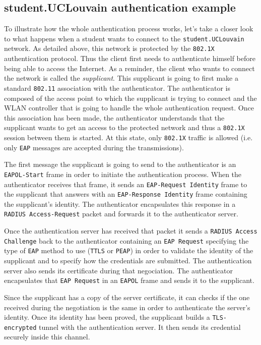\subsection{student.UCLouvain authentication example}
To illustrate how the whole authentication process works, let's take a closer look to what happens when a student wants to connect to the \texttt{student.UCLouvain} network.
As detailed above, this network is protected by the \texttt{802.1X} authentication protocol. Thus the client first needs to authenticate himself before being able to access the Internet.
As a reminder, the client who wants to connect the network is called the \textit{supplicant}. This supplicant is going to first make a standard \texttt{802.11} association with the authenticator. The authenticator is composed of the access point to which the supplicant is trying to connect and the WLAN controller that is going to handle the whole authentication request. Once this association has been made, the authenticator understands that the supplicant wants to get an access to the protected network and thus a \texttt{802.1X} session between them is started. At this state, only \texttt{802.1X} traffic is allowed (i.e. only \texttt{EAP} messages are accepted during the transmissions).

The first message the supplicant is going to send to the authenticator is an \texttt{EAPOL-Start} frame in order to initiate the authentication process. When the authenticator receives that frame, it sends an \texttt{EAP-Request Identity} frame to the supplicant that answers with an \texttt{EAP-Response Identity} frame containing the supplicant's identity. The authenticator encapsulates this response in a \texttt{RADIUS Access-Request} packet and forwards it to the authenticator server.

Once the authentication server has received that packet it sends a \texttt{RADIUS Access Challenge} back to the authenticator containing an \texttt{EAP Request} specifying the type of \texttt{EAP} method to use (\texttt{TTLS} or \texttt{PEAP}) in order to validate the identity of the supplicant and to specify how the credentials are submitted. The authentication server also sends its certificate during that negociation. The authenticator encapsulates that \texttt{EAP Request} in an \texttt{EAPOL} frame and sends it to the supplicant.

Since the supplicant has a copy of the server certificate, it can checks if the one received during the negotiation is the same in order to authenticate the server's identity. Once its identity has been proved, the supplicant builds a \texttt{TLS-encrypted} tunnel with the authentication server. It then sends its credential securely inside this channel.

